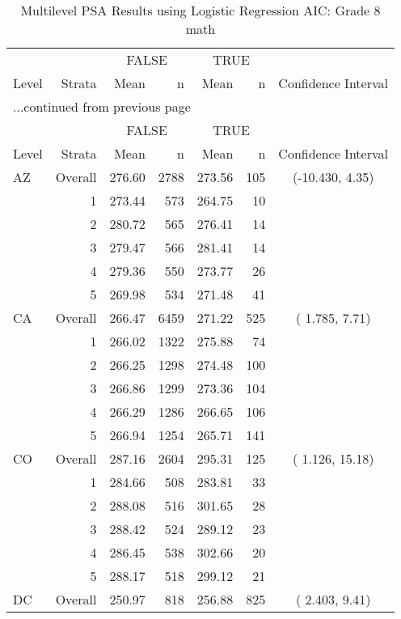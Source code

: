 \begin{longtable}{lrrr@{\extracolsep{.25cm}}rrc}
\caption{Multilevel PSA Results using Logistic Regression AIC: Grade 8 math} \\ 
   \hline & & \multicolumn{2}{c}{FALSE} & \multicolumn{2}{c}{TRUE} & \\ \cline{3-4} \cline{5-6} Level & Strata & Mean & n & Mean & n & Confidence Interval \\ \hline\endfirsthead \multicolumn{7}{l}{{...continued from previous page}}\\ \hline  & & \multicolumn{2}{c}{FALSE} & \multicolumn{2}{c}{TRUE} & \\ \cline{3-4} \cline{5-6} Level & Strata & Mean & n & Mean & n & Confidence Interval \\ \hline \endhead \endfoot \endlastfoot  \hline
AZ & Overall & 276.60 & 2788 & 273.56 & 105 & (-10.430,   4.35) \\ 
   & 1 & 273.44 & 573 & 264.75 &  10 &  \\ 
   & 2 & 280.72 & 565 & 276.41 &  14 &  \\ 
   & 3 & 279.47 & 566 & 281.41 &  14 &  \\ 
   & 4 & 279.36 & 550 & 273.77 &  26 &  \\ 
   & 5 & 269.98 & 534 & 271.48 &  41 &  \\ 
   \hline
CA & Overall & 266.47 & 6459 & 271.22 & 525 & (  1.785,   7.71) \\ 
   & 1 & 266.02 & 1322 & 275.88 &  74 &  \\ 
   & 2 & 266.25 & 1298 & 274.48 & 100 &  \\ 
   & 3 & 266.86 & 1299 & 273.36 & 104 &  \\ 
   & 4 & 266.29 & 1286 & 266.65 & 106 &  \\ 
   & 5 & 266.94 & 1254 & 265.71 & 141 &  \\ 
   \hline
CO & Overall & 287.16 & 2604 & 295.31 & 125 & (  1.126,  15.18) \\ 
   & 1 & 284.66 & 508 & 283.81 &  33 &  \\ 
   & 2 & 288.08 & 516 & 301.65 &  28 &  \\ 
   & 3 & 288.42 & 524 & 289.12 &  23 &  \\ 
   & 4 & 286.45 & 538 & 302.66 &  20 &  \\ 
   & 5 & 288.17 & 518 & 299.12 &  21 &  \\ 
   \hline
DC & Overall & 250.97 & 818 & 256.88 & 825 & (  2.403,   9.41) \\ 

\end{longtable}

